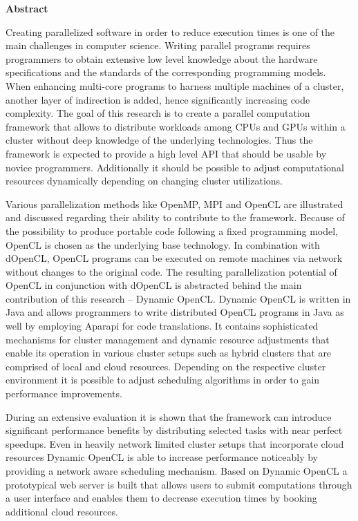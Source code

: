 \begin{center}\textsf{\textbf{Abstract}}\end{center}

\noindent Creating parallelized software in order to reduce execution times is one of the main challenges in computer science. Writing parallel programs requires programmers to obtain extensive low level knowledge about the hardware specifications and the standards of the corresponding programming models. When enhancing multi-core programs to harness multiple machines of a cluster, another layer of indirection is added, hence significantly increasing code complexity. The goal of this research is to create a parallel computation framework that allows to distribute workloads among CPUs and GPUs within a cluster without deep knowledge of the underlying technologies. Thus the framework is expected to provide a high level API that should be usable by novice programmers. Additionally it should be possible to adjust computational resources dynamically depending on changing cluster utilizations.

Various parallelization methods like OpenMP, MPI and OpenCL are illustrated and discussed regarding their ability to contribute to the framework. Because of the possibility to produce portable code following a fixed programming model, OpenCL is chosen as the underlying base technology. In combination with dOpenCL, OpenCL programs can be executed on remote machines via network without changes to the original code. The resulting parallelization potential of OpenCL in conjunction with dOpenCL is abstracted behind the main contribution of this research -- Dynamic OpenCL. Dynamic OpenCL is written in Java and allows programmers to write distributed OpenCL programs in Java as well by employing Aparapi for code translations. It contains sophisticated mechanisms for cluster management and dynamic resource adjustments that enable its operation in various cluster setups such as hybrid clusters that are comprised of local and cloud resources. Depending on the respective cluster environment it is possible to adjust scheduling algorithms in order to gain performance improvements.

During an extensive evaluation it is shown that the framework can introduce significant performance benefits by distributing selected tasks with near perfect speedups. Even in heavily network limited cluster setups that incorporate cloud resources Dynamic OpenCL is able to increase performance noticeably by providing a network aware scheduling mechanism. Based on Dynamic OpenCL a prototypical web server is built that allows users to submit computations through a user interface and enables them to decrease execution times by booking additional cloud resources.

